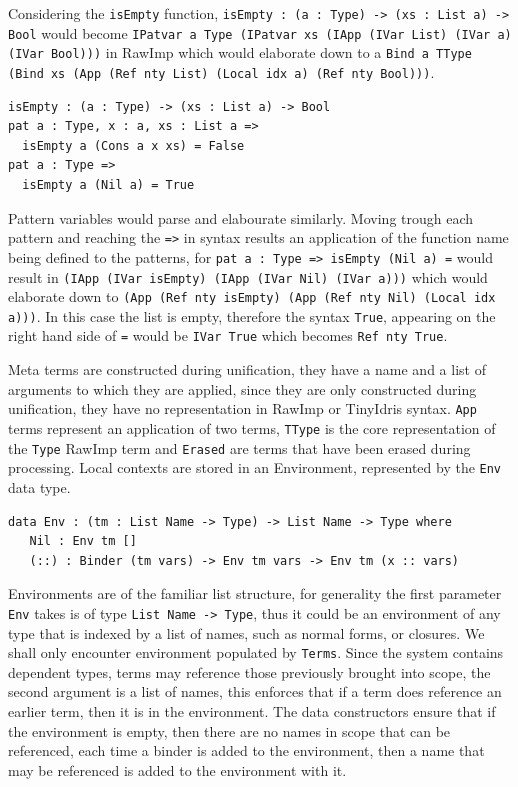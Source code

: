 \documentclass[a4paper]{article}
\begin{document}
Considering the \texttt{isEmpty} function, \texttt{isEmpty : (a : Type) -> (xs : List a) -> Bool}
would become \texttt{IPatvar a Type (IPatvar xs (IApp (IVar List) (IVar a) (IVar Bool)))} in RawImp
which would elaborate down to a \texttt{Bind a TType (Bind xs (App (Ref nty List) (Local idx a) (Ref nty Bool)))}.

\begin{center}
  \begin{verbatim} 
isEmpty : (a : Type) -> (xs : List a) -> Bool
pat a : Type, x : a, xs : List a =>
  isEmpty a (Cons a x xs) = False
pat a : Type =>
  isEmpty a (Nil a) = True
  \end{verbatim}
\end{center}

Pattern variables would parse and elabourate similarly. Moving trough each pattern and reaching the
\texttt{=>} in syntax results an application of the function name being defined to the patterns, for
\texttt{pat a : Type => isEmpty (Nil a) =} would result in \texttt{(IApp (IVar isEmpty) (IApp (IVar Nil) (IVar a)))}
which would elaborate down to \texttt{(App (Ref nty isEmpty) (App (Ref nty Nil) (Local idx a)))}. In this case
the list is empty, therefore the syntax \texttt{True}, appearing on the right hand side of \texttt{=} would be
\texttt{IVar True} which becomes \texttt{Ref nty True}. 

Meta terms are constructed during unification, they have a name and a
list of arguments to which they are applied, since they are only
constructed during unification, they have no representation in RawImp or
TinyIdris syntax. \texttt{App} terms represent an application of two terms,
\texttt{TType} is the core representation of the \texttt{Type} RawImp term and
\texttt{Erased} are terms that have been erased during processing.
Local contexts are stored in an Environment, represented by the \texttt{Env}
data type.

\begin{center}
\begin{verbatim}
data Env : (tm : List Name -> Type) -> List Name -> Type where
   Nil : Env tm []
   (::) : Binder (tm vars) -> Env tm vars -> Env tm (x :: vars)
\end{verbatim}
\end{center}

Environments are of the familiar list structure, for generality the 
first parameter \texttt{Env} takes is of type \texttt{List Name -> Type}, thus it 
could be an environment of any type that is indexed by a list of names,
such as normal forms, or closures. We shall only encounter 
environment populated by \texttt{Terms}. Since the system contains dependent types, 
terms may reference those previously brought into scope, the second
argument is a list of names, this enforces that if a term does 
reference an earlier term, then it is in the environment. The data 
constructors ensure that if the environment is empty, then there are 
no names in scope that can be referenced, each time a binder is added
to the environment, then a name that may be referenced is added to the 
environment with it.  
\end{document}
